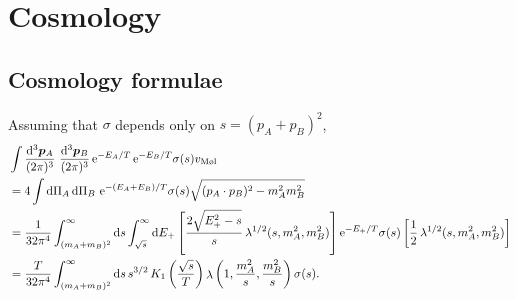 \documentclass[CheatSheet]{subfiles}
\newcommand{\ddP}[2][3]{\frac{\dd^{#1}\vc#2}{(2\pi)^{#1}}}
\begin{document}
\section{Cosmology}
\detailstyle
\subsection{Cosmology formulae}
Assuming that $\sigma$ depends only on $s=(p_A+p_B)^2$, 
\begin{align}
& \int\ddP{p_A}\,\,\ddP{p_B}\ee^{-E_A/T}\ee^{-E_B/T}\sigma(s)v_{\text{M\o l}}
\\&=4\int\dd\Pi_A\dd\Pi_B\, \ee^{-(E_A+E_B)/T}\sigma(s)\sqrt{(p_A\cdot p_B)^2-m_A^2m_B^2}
\\&=
\frac{1}{32\pi^4}
\int_{(m_A+m_B)^2}^\infty\dd s
\int_{\sqrt{s}}^\infty\dd E_+\left[\frac{2\sqrt{E_+^2-s}}{s}\mathop{\lambda^{1/2}}(s,m_A^2,m_B^2)\right]
\ee^{-E_+/T}\sigma(s)\left[\frac12\mathop{\lambda^{1/2}}(s,m_A^2,m_B^2)\right]
\\&=
\frac{T}{32\pi^4}
\int_{(m_A+m_B)^2}^\infty\dd s\,s^{3/2} \mathop{K_1}\left(\frac{\sqrt{s}}{T}\right)
\mathop{\lambda}\left(1,\frac{m_A^2}s,\frac{m_B^2}s\right)\sigma(s).
\end{align}
\end{document}
